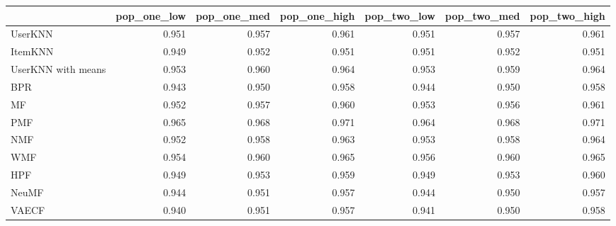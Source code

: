 \begin{tabular}{lrrrrrr}
\toprule
{} &  pop\_one\_low &  pop\_one\_med &  pop\_one\_high &  pop\_two\_low &  pop\_two\_med &  pop\_two\_high \\
\midrule
UserKNN            &        0.951 &        0.957 &         0.961 &        0.951 &        0.957 &         0.961 \\
ItemKNN            &        0.949 &        0.952 &         0.951 &        0.951 &        0.952 &         0.951 \\
UserKNN with means &        0.953 &        0.960 &         0.964 &        0.953 &        0.959 &         0.964 \\
BPR                &        0.943 &        0.950 &         0.958 &        0.944 &        0.950 &         0.958 \\
MF                 &        0.952 &        0.957 &         0.960 &        0.953 &        0.956 &         0.961 \\
PMF                &        0.965 &        0.968 &         0.971 &        0.964 &        0.968 &         0.971 \\
NMF                &        0.952 &        0.958 &         0.963 &        0.953 &        0.958 &         0.964 \\
WMF                &        0.954 &        0.960 &         0.965 &        0.956 &        0.960 &         0.965 \\
HPF                &        0.949 &        0.953 &         0.959 &        0.949 &        0.953 &         0.960 \\
NeuMF              &        0.944 &        0.951 &         0.957 &        0.944 &        0.950 &         0.957 \\
VAECF              &        0.940 &        0.951 &         0.957 &        0.941 &        0.950 &         0.958 \\
\bottomrule
\end{tabular}
